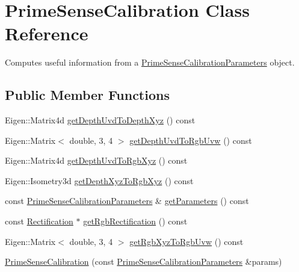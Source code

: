 \hypertarget{classfovis_1_1PrimeSenseCalibration}{
\section{PrimeSenseCalibration Class Reference}
\label{classfovis_1_1PrimeSenseCalibration}
}


Computes useful information from a \hyperlink{structfovis_1_1PrimeSenseCalibrationParameters}{PrimeSenseCalibrationParameters} object.  


\subsection*{Public Member Functions}
\begin{DoxyCompactItemize}
\item 
Eigen::Matrix4d \hyperlink{classfovis_1_1PrimeSenseCalibration_aa43ac49d34f38d0e9e0832095a4de0b2}{getDepthUvdToDepthXyz} () const 
\item 
Eigen::Matrix$<$ double, 3, 4 $>$ \hyperlink{classfovis_1_1PrimeSenseCalibration_a43fefe8a116641f2b13f36d9c4c56769}{getDepthUvdToRgbUvw} () const 
\item 
Eigen::Matrix4d \hyperlink{classfovis_1_1PrimeSenseCalibration_a26e97ef13e577339bd0a65436520dd8c}{getDepthUvdToRgbXyz} () const 
\item 
Eigen::Isometry3d \hyperlink{classfovis_1_1PrimeSenseCalibration_a83ad17d21565728e4fe11f7a354898f9}{getDepthXyzToRgbXyz} () const 
\item 
const \hyperlink{structfovis_1_1PrimeSenseCalibrationParameters}{PrimeSenseCalibrationParameters} \& \hyperlink{classfovis_1_1PrimeSenseCalibration_a5ada9aeb464dbf970ca3ab17b00e2e80}{getParameters} () const 
\item 
const \hyperlink{classfovis_1_1Rectification}{Rectification} $\ast$ \hyperlink{classfovis_1_1PrimeSenseCalibration_a2cf5ecdfafecd94c7a779cc6ff2e7f2b}{getRgbRectification} () const 
\item 
Eigen::Matrix$<$ double, 3, 4 $>$ \hyperlink{classfovis_1_1PrimeSenseCalibration_a432a9f0c26b6438095774e8a60dcb892}{getRgbXyzToRgbUvw} () const 
\item 
\hyperlink{classfovis_1_1PrimeSenseCalibration_a594fad2cbbce12a3e74c7427357c733c}{PrimeSenseCalibration} (const \hyperlink{structfovis_1_1PrimeSenseCalibrationParameters}{PrimeSenseCalibrationParameters} \&params)
\end{DoxyCompactItemize}


